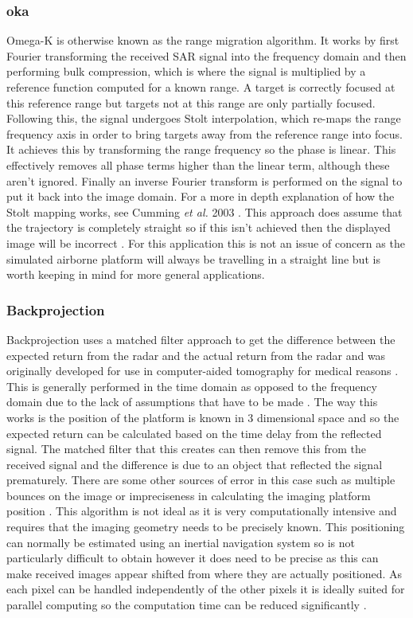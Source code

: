 \subsubsection{\gls{oka}}
Omega-K is otherwise known as the range migration algorithm. It works by first Fourier transforming the received SAR signal into the frequency domain and then performing bulk compression, which is where the signal is multiplied by a reference function computed for a known range. A target is correctly focused at this reference range but targets not at this range are only partially focused. Following this, the signal undergoes Stolt interpolation, which re-maps the range frequency axis in order to bring targets away from the reference range into focus. It achieves this by transforming the range frequency so the phase is linear. This effectively removes all phase terms higher than the linear term, although these aren't ignored. Finally an inverse Fourier transform is performed on the signal to put it back into the image domain. For a more in depth explanation of how the Stolt mapping works, see Cumming \textit{et al.} 2003 \cite[section~3]{cummingInterpretationsOmegaKAlgorithm2003}. This approach does assume that the trajectory is completely straight so if this isn't achieved then the displayed image will be incorrect \cite{albuquerqueApplicationsTimeDomainBackProjection}. For this application this is not an issue of concern as the simulated airborne platform will always be travelling in a straight line but is worth keeping in mind for more general applications.
\subsubsection{Backprojection}
Backprojection uses a matched filter approach to get the difference between the expected return from the radar and the actual return from the radar and was originally developed for use in computer-aided tomography for medical reasons \cite{naComparisonBackProjectionRange2006}. This is generally performed in the time domain as opposed to the frequency domain due to the lack of assumptions that have to be made \cite{albuquerqueApplicationsTimeDomainBackProjection}. The way this works is the position of the platform is known in 3 dimensional space and so the expected return can be calculated based on the time delay from the reflected signal. The matched filter that this creates can then remove this from the received signal and the difference is due to an object that reflected the signal prematurely. There are some other sources of error in this case such as multiple bounces on the image or impreciseness in calculating the imaging platform position \cite{duerschBackprojectionSyntheticAperture2013}. This algorithm is not ideal as it is very computationally intensive and requires that the imaging geometry needs to be precisely known. This positioning can normally be estimated using an inertial navigation system so is not particularly difficult to obtain however it does need to be precise as this can make received images appear shifted from where they are actually positioned. As each pixel can be handled independently of the other pixels it is ideally suited for parallel computing so the computation time can be reduced significantly \cite{albuquerqueApplicationsTimeDomainBackProjection}.
